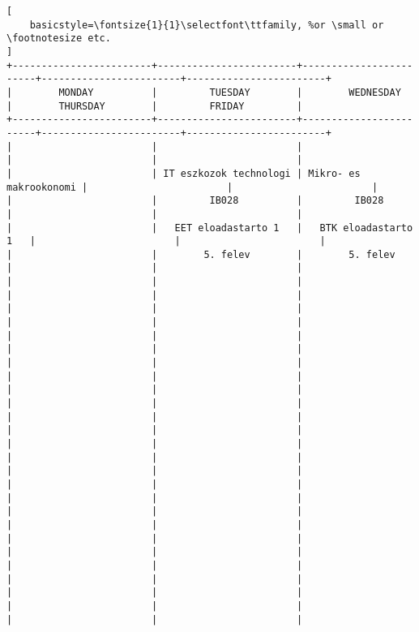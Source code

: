 \begin{lstlisting}[
    basicstyle=\fontsize{1}{1}\selectfont\ttfamily, %or \small or \footnotesize etc.
]
+------------------------+------------------------+------------------------+------------------------+------------------------+
|        MONDAY          |         TUESDAY        |        WEDNESDAY       |        THURSDAY        |         FRIDAY         |
+------------------------+------------------------+------------------------+------------------------+------------------------+
|                        |                        |                        |                        |                        | 
|                        | IT eszkozok technologi | Mikro- es makrookonomi |                        |                        | 
|                        |         IB028          |         IB028          |                        |                        | 
|                        |   EET eloadastarto 1   |   BTK eloadastarto 1   |                        |                        | 
|                        |        5. felev        |        5. felev        |                        |                        | 
|                        |                        |                        |                        |                        | 
|                        |                        |                        |                        |                        | 
|                        |                        |                        |                        |                        | 
|                        |                        |                        |                        |                        | 
|                        |                        |                        |                        |                        | 
|                        |                        |                        |                        |                        | 
|                        |                        |                        |                        |                        | 
|                        |                        |                        |                        |                        | 
|                        |                        |                        |                        |                        | 
|                        |                        |                        |                        |                        | 
|                        |                        |                        |                        |                        | 
|                        |                        |                        |                        |                        | 
|                        |                        |                        |                        |                        | 

\end{lstlisting}

